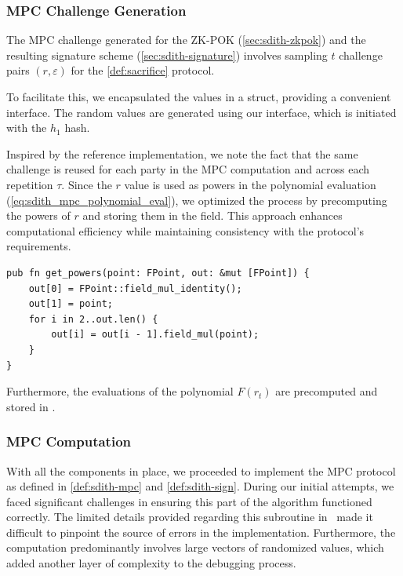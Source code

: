\documentclass[11pt]{report}
\theoremstyle{definition}
\theoremstyle{plain}
\begin{document}
\subsubsection{MPC Challenge Generation}

The MPC challenge generated for the ZK-POK (\autoref{sec:sdith-zkpok}) and the resulting signature scheme (\autoref{sec:sdith-signature}) involves sampling $t$ challenge pairs $(r, \varepsilon)$ for the \autoref{def:sacrifice} protocol.

To facilitate this, we encapsulated the values in a  struct, providing a convenient interface. The random values are generated using our  interface, which is initiated with the $h_1$ hash.

Inspired by the reference implementation, we note the fact that the same challenge is reused for each party in the MPC computation and across each repetition $\tau$. Since the $r$ value is used as powers in the polynomial evaluation (\autoref{eq:sdith_mpc_polynomial_eval}), we optimized the process by precomputing the powers of $r$ and storing them in the  field. This approach enhances computational efficiency while maintaining consistency with the protocol's requirements.

\begin{verbatim}
pub fn get_powers(point: FPoint, out: &mut [FPoint]) {
    out[0] = FPoint::field_mul_identity();
    out[1] = point;
    for i in 2..out.len() {
        out[i] = out[i - 1].field_mul(point);
    }
}
\end{verbatim}

Furthermore, the evaluations of the polynomial $F(r_t)$ are precomputed and stored in .

\subsubsection{MPC Computation}

With all the components in place, we proceeded to implement the MPC protocol as defined in \autoref{def:sdith-mpc} and \autoref{def:sdith-sign}. During our initial attempts, we faced significant challenges in ensuring this part of the algorithm functioned correctly. The limited details provided regarding this subroutine in~\cite{aguilarsyndrome11} made it difficult to pinpoint the source of errors in the implementation. Furthermore, the computation predominantly involves large vectors of randomized values, which added another layer of complexity to the debugging process.
\end{document}
